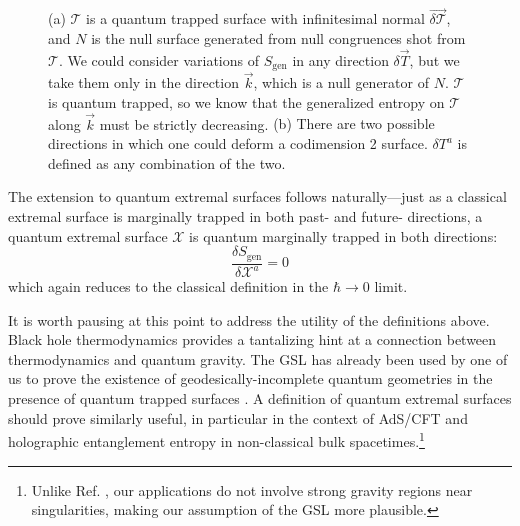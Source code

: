 \documentclass[12pt]{article}
\theoremstyle{remark}
\numberwithin{equation}{section}
\numberwithin{equation}{section}
\begin{document}
\begin{center}
\begin{figure}[t]
\centering

\qquad
{}
\caption{ (a) {\small $\mathcal{T}$ is a quantum trapped surface with infinitesimal normal $\vec{\delta \mathcal{T}}$, and $N$ is the null surface generated from null congruences shot from $\mathcal{T}$. We could consider variations of $S_{\mathrm{gen}}$ in any direction $\delta \vec{T}$, but we take them only in the direction $\vec{k}$, which is a null generator of $N$. $\mathcal{T}$ is quantum trapped, so we know that the generalized entropy on $\mathcal{T}$ along $\vec{k}$ must be strictly decreasing.} (b) There are two possible directions in which one could deform a codimension 2 surface. $\delta T^{a}$ is defined as any combination of the two.}
\label{Thm3}
\end{figure}
\end{center}


The extension to quantum extremal surfaces follows naturally---just as a classical extremal surface is marginally trapped in both past- and future- directions, a quantum extremal surface $\mathcal{X}$ is quantum marginally trapped in both directions:
\begin{equation} \frac{\delta S_\mathrm{gen}}{\delta \mathcal{X}^{a}}=0\end{equation}
which again reduces to the classical definition in the $\hbar \to 0$ limit.

It is worth pausing at this point to address the utility of the definitions above. Black hole thermodynamics provides a tantalizing hint at a connection between thermodynamics and quantum gravity. The GSL has already been used by one of us to prove the existence of geodesically-incomplete quantum geometries in the presence of quantum trapped surfaces \cite{Wall12}.  A definition of quantum extremal surfaces should prove similarly useful, in particular in the context of AdS/CFT and holographic entanglement entropy in non-classical bulk spacetimes.\footnote{Unlike Ref. \cite{Wall12}, our applications do not involve strong gravity regions near singularities, making our assumption of the GSL more plausible.}
\end{document}
